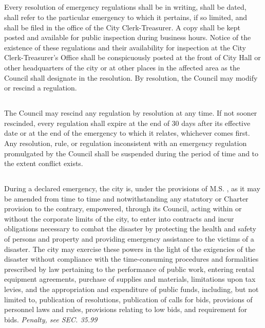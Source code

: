 \subsection{}
Every resolution of emergency regulations shall be in writing, shall be dated, shall refer to the particular emergency to which it pertains, if so limited, and shall be filed in the office of the City Clerk-Treasurer. A copy shall be kept posted and available for public inspection during business hours. Notice of the existence of these regulations and their availability for inspection at the City Clerk-Treasurer’s Office shall be conspicuously posted at the front of City Hall or other headquarters of the city or at other places in the affected area as the Council shall designate in the resolution. By resolution, the Council may modify or rescind a regulation.
\subsection{}
The Council may rescind any regulation by resolution at any time. If not sooner rescinded, every regulation shall expire at the end of 30 days after its effective date or at the end of the emergency to which it relates, whichever comes first. Any resolution, rule, or regulation inconsistent with an emergency regulation promulgated by the Council shall be suspended during the period of time and to the extent conflict exists.
\subsection{}
During a declared emergency, the city is, under the provisions of M.S. , as it may be amended from time to time and notwithstanding any statutory or Charter provision to the contrary, empowered, through its Council, acting within or without the corporate limits of the city, to enter into contracts and incur obligations necessary to combat the disaster by protecting the health and safety of persons and property and providing emergency assistance to the victims of a disaster. The city may exercise these powers in the light of the exigencies of the disaster without compliance with the time-consuming procedures and formalities prescribed by law pertaining to the performance of public work, entering rental equipment agreements, purchase of supplies and materials, limitations upon tax levies, and the appropriation and expenditure of public funds, including, but not limited to, publication of resolutions, publication of calls for bids, provisions of personnel laws and rules, provisions relating to low bids, and requirement for bids.\newline
\emph{Penalty, see SEC. 35.99}

